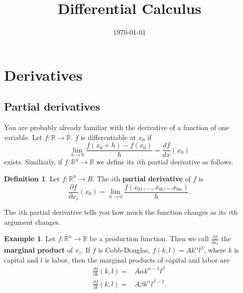 \documentclass[12pt,reqno]{amsart}
\title{Differential Calculus}
\date{\today}
\theoremstyle{definition}
\newtheorem{definition}{Definition}[section]
\newtheorem{example}{Example}[section]
\def\R{\mathbb{R}}
\renewcommand{\to}{{\rightarrow}}
\begin{document}
\maketitle



\section{Derivatives}

\subsection{Partial derivatives}
You are probably already familiar with the derivative of a function of
one variable. Let $f: \R \to \R$. $f$ is differentiable at $x_0$ if 
\[ \lim_{h \to 0} \frac{f(x_0 + h) - f(x_0)}{h} = \frac{d
  f}{dx}(x_0) \]
exists. Similiarly, if $f: \R^n \to \R$ we define its $i$th partial
derivative as follows.
\begin{definition}
  Let $f:\R^n \to R$. The $i$th \textbf{partial derivative} of $f$ is 
  \[ \frac{\partial f}{\partial x_i} (x_0) = \lim_{h \to 0}
  \frac{f(x_{01},...,x_{0i}, ... x_{0n})}{h}. \]
\end{definition}
The $i$th partial derivative tells you how much the function changes
as its $i$th argument changes.
\begin{example}
  Let $f:\R^n \to \R$ be a production function. Then we call
  $\frac{\partial f}{\partial x_i}$ the \textbf{marginal product} of
  $x_i$. If $f$ is Cobb-Douglas, $f(k,l) = Ak^\alpha l^\beta$, where
  $k$ is capital and $l$ is labor, then the marginal products of
  capital and labor are
  \begin{align*}
    \frac{\partial f}{\partial k} (k,l) = & A \alpha k^{\alpha-1}
    l^\beta \\
    \frac{\partial f}{\partial l} (k,l) = & A \beta k^{\alpha}
    l^{\beta -1}.
  \end{align*}
\end{example}
\end{document}
